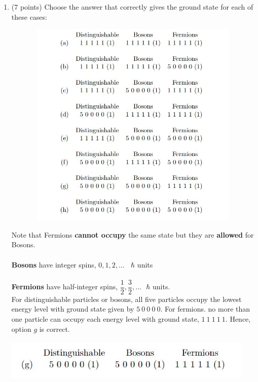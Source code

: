 \documentclass[fleqn]{article}
\begin{document}
  \begin{enumerate}
    \item (7 points) Choose the answer that correctly gives the ground state for each of these cases:
    \begin{center}
      \includegraphics[height=10cm, width=15cm]{1.JPG}
    \end{center}

      \textcolor{hwColor}{
        Note that Fermions \textbf{cannot occupy} the same state but they are
        \textbf{allowed} for Bosons.
        \\
        \\
        \textbf{Bosons} have integer spins, $0,1,2,... ~~~~ \hbar$ units
        \\
        \\
        \textbf{Fermions} have half-integer spins, $\dfrac{1}{2}, \dfrac{3}{2},... ~~~ \hbar$ units.
        \\
        For distinguishable particles or bosons, all five particles occupy the lowest 
        energy level with ground state given by $5 ~ 0 ~ 0 ~ 0 ~ 0$. For fermions. no more than 
        one particle can occupy each energy level with ground state, $1 ~ 1 ~ 1 ~ 1 ~ 1$. Hence, option 
        $g$ is correct.
      }
      \begin{center}
        \includegraphics[height=2cm, width=12cm]{Answer1.JPG}
      \end{center}


\end{enumerate}
\end{document}
